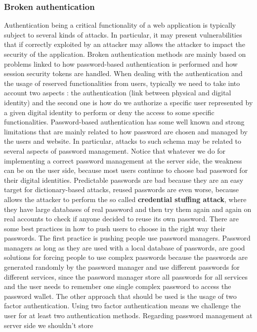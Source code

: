\subsubsection{Broken authentication}
Authentication being a critical functionality of a web application is typically subject to several kinds of attacks. In particular, it may present vulnerabilities that if correctly exploited by an attacker may allows the attacker to impact the security of the application. Broken authentication methods are mainly based on problems linked to how password-based authentication is performed and how session security tokens are handled. When dealing with the authentication and the usage of reserved functionalities from users, typically we need to take into account two aspects : the authentication (link between physical and digital identity) and the second one is how do we authorize a specific user represented by a given digital identity to perform or deny the access to some specific functionalities. Password-based authentication has some well known and strong limitations that are mainly related to how password are chosen and managed by the users and website. In particular, attacks to such schema may be related to several aspects of password management. Notice that whatever we do for implementing a correct password management at the server side, the weakness can be on the user side, because most users continue to choose bad password for their digital identities. Predictable passwords are bad because they are an easy target for dictionary-based attacks, reused passwords are even worse, because allows the attacker to perform the so called \textbf{credential stuffing attack}, where they have large databases of real password and then try them again and again on real accounts to check if anyone decided to reuse its own password. There are some best practices in how to push users to choose in the right way their passwords. The first practice is pushing people use password managers. Password managers as long as they are used with a local database of passwords, are good solutions for forcing people to use complex passwords because the passwords are generated randomly by the password manager and use different passwords for different services, since the password manager store all passwords for all services and the user needs to remember one single complex password to access the password wallet. The other approach that should be used is the usage of two factor authentication. Using two factor authentication means we challenge the user for at least two authentication methods. Regarding password management at server side we shouldn't store
